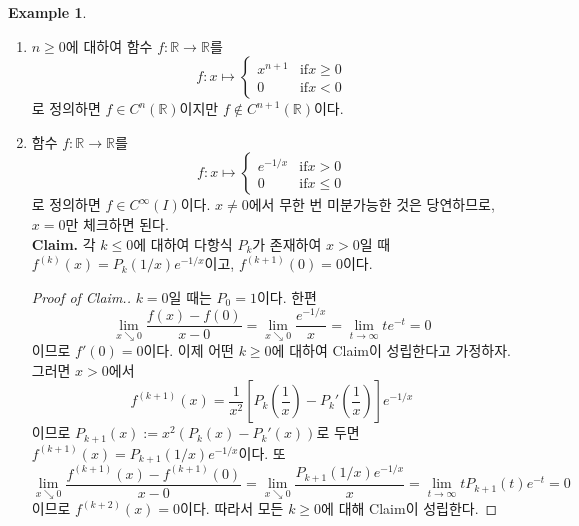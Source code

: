 \documentclass[11pt]{book}
\numberwithin{equation}{chapter}
\def\RR{\mathbb{R}}
\newcommand{\paren}[1]{\left(#1\right)}
\newcommand{\sqbracket}[1]{\left[#1\right]}
\def\textif{\text{if}}
\theoremstyle{definition}
\newtheorem*{ex}{Example}
\newenvironment{enum}
	{\begin{enumerate}[label=(\alph*), leftmargin=2\parindent]}
	{\end{enumerate}}
\begin{document}
\begin{ex}
    \quad

    \begin{enum}
        \item \(n \ge 0\)에 대하여 함수 \(f : \RR \to \RR\)를
        \[
            f : x \mapsto
            \begin{cases}
                x^{n+1} &\textif x \ge 0\\
                0 &\textif x < 0
            \end{cases}
        \]
        로 정의하면 \(f \in C^n(\RR)\)이지만 \(f \notin C^{n+1}(\RR)\)이다.
        \item 함수 \(f : \RR \to \RR\)를
        \[
            f : x \mapsto 
            \begin{cases}
                e^{-1/x} &\textif x > 0\\
                0 &\textif x \le 0
            \end{cases}
        \]
        로 정의하면 \(f \in C^\infty(I)\)이다. \(x \ne 0\)에서 무한 번 미분가능한 것은 당연하므로, \(x = 0\)만 체크하면 된다.\\
        \textbf{Claim.} 각 \(k \le 0\)에 대하여 다항식 \(P_k\)가 존재하여 \(x > 0\)일 때 \(f^{(k)}(x) = P_k(1/x)e^{-1/x}\)이고, \(f^{(k+1)}(0) = 0\)이다.
        \begin{proof}[Proof of Claim.]
            \(k = 0\)일 때는 \(P_0 = 1\)이다. 한편
            \[
            \lim_{x \searrow 0} \frac{f(x) - f(0)}{x - 0} = \lim_{x \searrow 0} \frac{e^{-1/x}}{x} = \lim_{t \to \infty} te^{-t} = 0 
            \]
            이므로 \(f'(0) = 0\)이다. 이제 어떤 \(k \ge 0\)에 대하여 Claim이 성립한다고 가정하자. 그러면 \(x > 0\)에서
            \[
            f^{(k+1)}(x) = \frac{1}{x^2}\sqbracket{P_k\paren{\frac{1}{x}} - P_k'\paren{\frac{1}{x}}}e^{-1/x}
            \]
            이므로 \(P_{k+1}(x) := x^2(P_k(x) - P_k'(x))\)로 두면 \(f^{(k+1)}(x) = P_{k+1}(1/x)e^{-1/x}\)이다. 또
            \[
            \lim_{x \searrow 0} \frac{f^{(k+1)}(x) - f^{(k+1)}(0)}{x-0} = \lim_{x \searrow 0} \frac{P_{k+1}(1/x)e^{-1/x}}{x} = \lim_{t \to \infty} tP_{k+1}(t)e^{-t} = 0    
            \]
            이므로 \(f^{(k+2)}(x) = 0\)이다. 따라서 모든 \(k \ge 0\)에 대해 Claim이 성립한다.
        \end{proof}
    \end{enum}
    
\end{ex}
\end{document}
